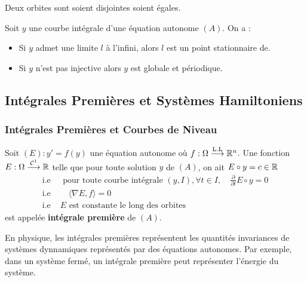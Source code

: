 \begin{prop}[Orbites]
    Deux orbites sont soient disjointes soient égales. 
\end{prop}

\begin{proposition}
    Soit $y$ une courbe intégrale d'une équation autonome $(A)$. On a : 
    \begin{itemize}
        \item Si $y$ admet une limite $l$ à l'infini, alors $l$ est un point stationnaire de. 
        \item Si $y$ n'est pas injective alors $y$ est globale et périodique. 
    \end{itemize}
\end{proposition}


\subsection{Intégrales Premières et Systèmes Hamiltoniens}

\subsubsection{Intégrales Premières et Courbes de Niveau}

\begin{definition}
    Soit $(E) : y' = f(y)$ une équation autonome où $f : \Omega \overset{\text{L.L}}{\longrightarrow} \mathbb{R}^n$. 
    Une fonction $E : \Omega \overset{ \mathcal{C}^1}{\longrightarrow} \mathbb{R}$ telle que pour toute 
    solution $y$ de $(A)$, on ait $E \circ y = c \in \mathbb{R} $ 
    \begin{align*}
        \text{i.e } & \text{ pour toute courbe intégrale } (y,I), \forall t \in I, \quad \frac{\partial}{\partial t} E \circ y = 0 \\ 
        \text{i.e } & \quad \langle \nabla E, f \rangle = 0 \\ 
        \text{i.e } & E \text{ est constante le long des orbites}
    \end{align*}
    est appelée \textbf{intégrale première} de $(A)$. 
\end{definition}

En physique, les intégrales premières représentent les quantités invariances de systèmes dynnamiques représentés par des équations 
autonomes. Par exemple, dans un système fermé, un intégrale première peut représenter l'énergie du système.

